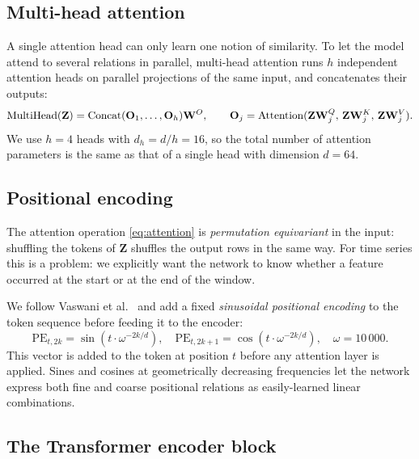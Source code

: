 \subsection{Multi-head attention}
\label{sec:mha-theory}

A single attention head can only learn one notion of similarity. To
let the model attend to several relations in parallel, multi-head
attention runs $h$ independent attention heads on parallel projections
of the same input, and concatenates their outputs:
\begin{equation}
    \operatorname{MultiHead}(\mathbf{Z}) = \mathrm{Concat}(\mathbf{O}_1, \dots, \mathbf{O}_h) \mathbf{W}^O,
    \qquad
    \mathbf{O}_j = \operatorname{Attention}(\mathbf{Z} \mathbf{W}_j^Q,\, \mathbf{Z} \mathbf{W}_j^K,\, \mathbf{Z} \mathbf{W}_j^V).
    \label{eq:mha}
\end{equation}
We use $h=4$ heads with $d_h = d / h = 16$, so the total number of
attention parameters is the same as that of a single head with
dimension $d=64$.

\subsection{Positional encoding}
\label{sec:posenc-theory}

The attention operation \cref{eq:attention} is \emph{permutation
equivariant} in the input: shuffling the tokens of $\mathbf{Z}$
shuffles the output rows in the same way. For time series this is a
problem: we explicitly want the network to know whether a feature
occurred at the start or at the end of the window.

We follow Vaswani et al.\ \cite{vaswani2017attention} and add a fixed
\emph{sinusoidal positional encoding} to the token sequence before
feeding it to the encoder:
\begin{equation}
    \mathrm{PE}_{t, 2k}   = \sin\!\left( t \cdot \omega^{-2k/d} \right),
    \quad
    \mathrm{PE}_{t, 2k+1} = \cos\!\left( t \cdot \omega^{-2k/d} \right),
    \quad
    \omega = 10\,000.
    \label{eq:posenc}
\end{equation}
This vector is added to the token at position $t$ before any attention
layer is applied. Sines and cosines at geometrically decreasing
frequencies let the network express both fine and coarse positional
relations as easily-learned linear combinations.

\subsection{The Transformer encoder block}
\label{sec:encoder-theory}

